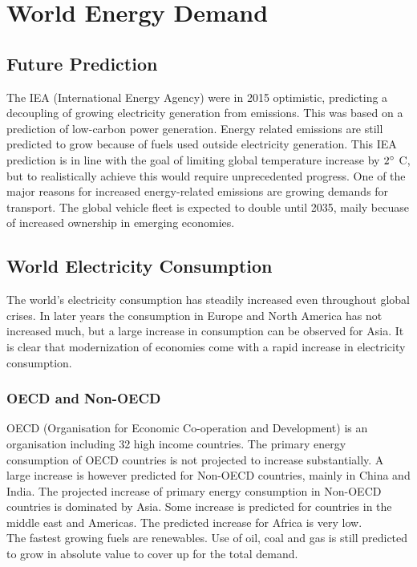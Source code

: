 \section{World Energy Demand}

\subsection{Future Prediction}
The IEA (International Energy Agency) were in 2015 optimistic, predicting a decoupling of growing electricity generation from \cotwo emissions.
This was based on a prediction of low-carbon power generation.
Energy related \cotwo emissions are still predicted to grow because of fuels used outside electricity generation.
This IEA prediction is in line with the goal of limiting global temperature increase by $2\degree$ C, but to realistically achieve this would require unprecedented progress.
One of the major reasons for increased energy-related \cotwo emissions are growing demands for transport.
The global vehicle fleet is expected to double until 2035, maily becuase of increased ownership in emerging economies.

\subsection{World Electricity Consumption}
The world's electricity consumption has steadily increased even throughout global crises.
In later years the consumption in Europe and North America has not increased much, but a large increase in consumption can be observed for Asia.
It is clear that modernization of economies come with a rapid increase in electricity consumption.

\subsubsection{OECD and Non-OECD}
OECD (Organisation for Economic Co-operation and Development) is an organisation including 32 high income countries.
The primary energy consumption of OECD countries is not projected to increase substantially.
A large increase is however predicted for Non-OECD countries, mainly in China and India.
The projected increase of primary energy consumption in Non-OECD countries is dominated by Asia.
Some increase is predicted for countries in the middle east and Americas.
The predicted increase for Africa is very low.\\

The fastest growing fuels are renewables.
Use of oil, coal and gas is still predicted to grow in absolute value to cover up for the total demand.

